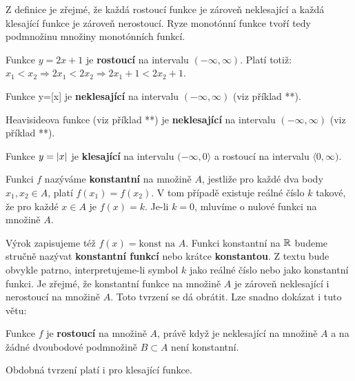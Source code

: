         Z definice je zřejmé, že každá rostoucí funkce je zároveň neklesající a každá klesající 
        funkce je zároveň nerostoucí. Ryze monotónní funkce tvoří tedy podmnožinu množiny 
        monotónních funkcí. 
           
        \begin{example}
          Funkce $y=2x+1$ je \textbf{rostoucí} na intervalu $(-\infty, \infty)$. Platí totiž:
          $x_1<x_2\Rightarrow 2x_1<2x_2\Rightarrow2x_1+1<2x_2+1$.
        \end{example}
        \begin{example}
          Funkce y=[x] je \textbf{neklesající} na intervalu $(-\infty, \infty)$ (viz příklad **). 
        \end{example}
        \begin{example}
          Heavisideova funkce (viz příklad **) je \textbf{neklesající} na intervalu $(-\infty,
          \infty)$ (viz příklad **). 
        \end{example}       
        \begin{example}
          Funkce $y=\left\lvert x\right\rvert$ je \textbf{klesající} na intervalu $(-\infty, 0\rangle$ a rostoucí na
          intervalu $\langle0, \infty)$. 
        \end{example}  
            
        \begin{definition}\label{MA1:def_lim03}
          Funkci $f$ nazýváme \textbf{konstantní} na množině $A$, jestliže pro každé dva body $x_1, 
          x_2\in A$, platí $f(x_1)=f(x_2)$. V tom případě existuje reálné číslo $k$ takové, že pro 
          každé $x\in A$ je $f(x)=k$. Je-li $k=0$, mluvíme o nulové funkci na množině $A$. 
        \end{definition} 
          
        Výrok  zapisujeme též $f(x)=\text{konst na }A$. 
        Funkci konstantní na $\mathbb{R}$ budeme stručně nazývat \textbf{konstantní funkcí} nebo 
        krátce \textbf{konstantou}. Z textu bude obvykle patrno, interpretujeme-li symbol $k$ jako 
        reálné číslo nebo jako konstantní funkci. Je zřejmé, že konstantní funkce na množině $A$ je 
        zároveň neklesající i nerostoucí na množině $A$. Toto tvrzení se dá obrátit. Lze snadno 
        dokázat i tuto větu:        
        \begin{lemma}\label{MA1:lem_lim01}
          Funkce $f$ je \textbf{rostoucí} na množině $A$, právě když je neklesající na množině $A$ a na žádné dvoubodové podmnožině $B\subset A$ není konstantní. 
        \end{lemma}
        Obdobná tvrzení platí i pro klesající funkce. 
               
